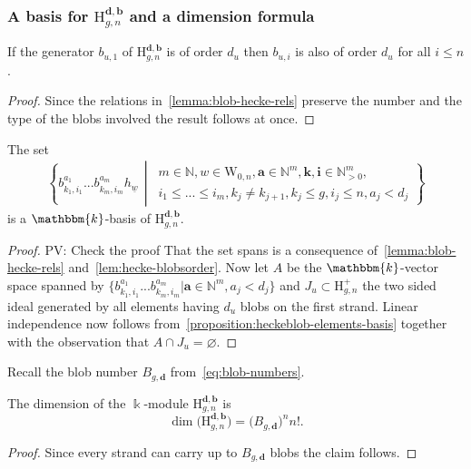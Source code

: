 \documentclass[a4paper,11pt]{amsart}
\renewcommand{\dots}{\text{...}}
\newcommand{\setstuff}[1]{\mathrm{#1}}
\newcommand{\KK}{\mathbbm{k}}
\newcommand{\N}{\mathbb{N}}
\newcommand{\bsym}[1]{\boldsymbol{#1}}
\newcommand{\bpar}{\bsym{b}}
\newcommand{\dpar}{\bsym{d}}
\def\PV#1{\textcolor[rgb]{0.00,0.00,1.00}{PV: #1}}
\numberwithin{equation}{section}
\let\fullref\autoref
\begin{document}
\subsubsection{A basis for $\setstuff{H}_{g,n}^{\dpar,\bpar}$ and a dimension formula}

\begin{lemma}\label{lem:hecke-blobsorder}
If the generator $b_{u,1}$ of $\setstuff{H}_{g,n}^{\dpar,\bpar}$ is of order $d_u$  then $b_{u,i}$ is also of order $d_u$ for all $i\leq n$.
\end{lemma}
\begin{proof}
Since the relations in~\fullref{lemma:blob-hecke-rels} preserve the number and the type of the blobs involved the result follows at once.
\end{proof}

\begin{proposition}\label{proposition:heckeblobcyclo-elements-basis}
The set 
\begin{gather}\label{eq:blob-basis-heckecyclo}
\left\{ 
b_{k_{1},i_{1}}^{a_{1}}\dots 
b_{k_{m},i_{m}}^{a_{m}}h_{\underline{w}} 
\,\middle\vert\,
\begin{gathered}
m\in\N,
w\in\setstuff{W}_{0,n},
\bsym{a}\in\N^{m}, 
\bsym{k},\bsym{i}\in\N^{m}_{>0},
\\
i_{1}\leq\dots\leq i_{m},k_{j}\neq k_{j+1},k_{j}\leq g,i_{j}\leq n,a_j < d_j
\end{gathered}
\right\} 
\end{gather}
is a $\KK$-basis of $\setstuff{H}_{g,n}^{\dpar,\bpar}$.
\end{proposition}

\begin{proof}
\PV{Check the proof}
That the set spans is a consequence of~\fullref{lemma:blob-hecke-rels} and~\fullref{lem:hecke-blobsorder}.
Now let $A$ be the $\KK$-vector space spanned by $\{ b_{k_{1},i_{1}}^{a_{1}}\dots  b_{k_{m},i_{m}}^{a_{m}}\vert\bsym{a}\in\N^{m},  a_j < d_j\}$ and $J_u\subset \setstuff{H}_{g,n}^+$ the two sided ideal generated by  all elements having $d_u$ blobs on the first strand. 
Linear independence now follows from~\fullref{proposition:heckeblob-elements-basis} together with the observation that $A\cap J_u=\varnothing$. 
\end{proof}

Recall the blob number $B_{g,\dpar}$  from~\eqref{eq:blob-numbers}.  
\begin{proposition}
The dimension of the $\Bbbk$-module $\setstuff{H}_{g,n}^{\dpar,\bpar}$ is
\[
\dim\bigl( \setstuff{H}_{g,n}^{\dpar,\bpar} \bigr) = \bigl(B_{g,\dpar}\bigr)^n n! . 
\]
\end{proposition}
\begin{proof}
Since every strand can carry up to $B_{g,\dpar}$ blobs the claim follows. 
\end{proof}
\end{document}
